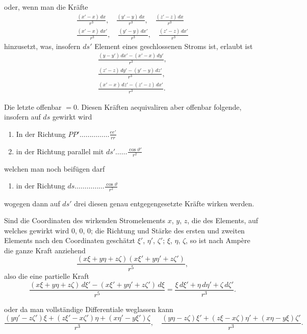 \documentclass[fontsize=10pt,paper=a5,pagesize=auto]{scrbook}
\newcommand{\origpage}[1]{\marginpar{\footnotesize\textit{S. #1}}}
\begin{document}
\origpage{621}
oder, wenn man die Kräfte
\begin{align*}
\frac{(x' - x) \, dx}{r^3}, \quad \frac{(y' - y) \, dx}{r^3}, \quad \frac{(z' - z) \, dx}{r^3}\\
\frac{(x' - x) \, dx'}{r^3}, \quad \frac{(y' - y) \, dx'}{r^3}, \quad \frac{(z' - z) \, dx'}{r^3}
\end{align*}
 hinzusetzt, was, insofern $ds'$ Element eines geschlossenen Stroms ist, erlaubt ist
\begin{align*}
\frac{(y - y') \, dx' - (x' - x) \, dy'}{r^3},\\
\frac{(z' - z) \, dy' - (y' - y) \, dz'}{r^3},\\
\frac{(x' - x) \, dz' - (z' - z) \, dx'}{r^3}.
\end{align*}

Die letzte offenbar $= 0$. Diesen Kräften aequivaliren aber offenbar folgende, insofern auf $ds$ gewirkt wird
\begin{enumerate}[label=\arabic*.]
\item In der Richtung $PP'\dots\dots\dots\dots\dots \frac{ee'}{rr}$
\item in der Richtung parallel mit $ds'\dots\dots \frac{\cos\vartheta'}{r^2}$
\end{enumerate}
welchen man noch beifügen darf
\begin{enumerate}[label=\arabic*.,start=3]
\item in der Richtung $ds\dots\dots\dots\dots\dots \frac{\cos\vartheta}{r^2}$
\end{enumerate}
wogegen dann auf $ds'$ drei diesen genau entgegengesetzte Kräfte wirken werden.

Sind die Coordinaten des wirkenden Stromelements $x$, $y$, $z$, die des Elements, auf welches gewirkt wird $0$, $0$, $0$; die Richtung und Stärke des ersten und zweiten Elements nach den Coordinaten geschätzt $\xi'$, $\eta'$, $\zeta'$; $\xi$, $\eta$, $\zeta$, so ist nach Ampère die ganze Kraft anziehend
\[
\frac{(x\xi + y\eta + z\zeta)(x\xi' + y\eta' + z\zeta')}{r^5},
\]
also die eine partielle Kraft
\[
\frac{(x\xi + y\eta + z\zeta) \, d\xi' - (x\xi' + y\eta' + z\zeta') \, d\xi}{r^5} = \frac{\xi \, d\xi' + \eta \, d\eta' + \zeta \, d\zeta'}{r^3}.
\]

\origpage{622}
oder da man vollständige Differentiale weglassen kann
\[
\frac{(y\eta' - z\zeta')\xi + (z\xi' - x\zeta')\eta + (x\eta' - y\xi')\zeta}{r^3}, \quad
\frac{(y\eta - z\zeta)\xi' + (z\xi - x\zeta)\eta' + (x\eta - y\xi)\zeta'}{r^3}.
\]
\end{document}
